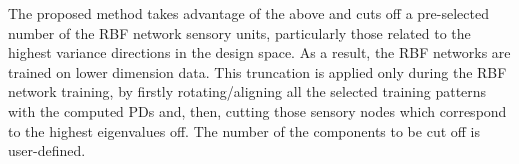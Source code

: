 The proposed method takes advantage of the above and cuts off a pre-selected number of the RBF network sensory units, particularly those related to the highest variance directions in the design space. As a result, the RBF networks are trained on lower dimension data. 
This truncation is applied only during the RBF network training, by firstly rotating/aligning all the selected training patterns with the computed PDs and, then, cutting those sensory nodes which correspond to the highest eigenvalues off. The number of the components to be cut off is user-defined.
    
    
    

